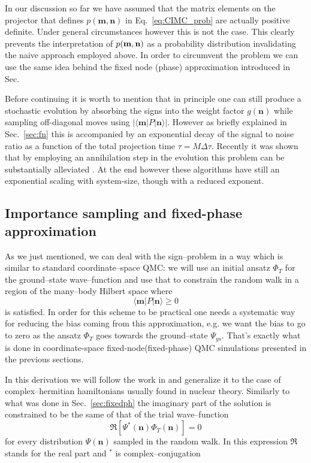 In our discussion so far we have assumed that the matrix elements on the projector that defines $p(\mathbf{m},\mathbf{n})$ in Eq.~\eqref{eq:CIMC_prob} are
actually positive definite. Under general circumstances however this is not the case. This clearly prevents the interpretation 
of $p({\bf m},{\bf n})$ as a probability distribution invalidating the naive approach employed above. In order to circumvent the problem we can use the same idea behind the
fixed node (phase) approximation introduced in Sec.~\label{sec:fn}

Before continuing it is worth to mention that in principle one can still produce a stochastic evolution by absorbing the signs into the weight factor $g(\mathbf{n})$
while sampling off-diagonal moves using $\left \vert \langle \mathbf{m} \lvert P \rvert \mathbf{n} \rangle \right\vert$. However as briefly explained in Sec.~\ref{sec:fn} 
this is accompanied by an exponential decay of the signal to noise ratio as a function of the total projection time $\tau = M \Delta\tau$. Recently it was shown 
that by employing an annihilation step in the evolution this problem can be substantially alleviated \cite{Booth09,Petruzielo12,Booth13}. At the end however these 
algorithms have still an exponential scaling with system-size, though with a reduced exponent.

\subsection{Importance sampling and fixed-phase approximation}
\label{subsect:CCDMC-IS}
As we just mentioned, we can deal with the sign--problem in a way which is similar to standard coordinate--space QMC: we will use an initial ansatz $\Phi_T$ 
for the ground--state wave--function and use that to constrain the random walk in a region of the many--body Hilbert space where 
\begin{equation}
\langle \mathbf{m} \lvert P \rvert \mathbf{n} \rangle \geq 0
\end{equation}
is satisfied. In order for this scheme to be practical one needs a systematic way for reducing the bias coming from this approximation, e.g. we want the bias 
to go to zero as the ansatz $\Phi_T$ goes towards the ground--state $\Psi_{gs}$. That's exactly what is done in coordinate-space fixed-node(fixed-phase) QMC simulations 
presented in the previous sections.

In this derivation we will follow the work in \cite{TenHaaf95,Sorella00} and generalize it to the case of complex--hermitian hamiltonians usually found in nuclear theory.
Similarly to what was done in Sec.~\ref{sec:fixedph} the imaginary part of the solution is constrained to be the same of that of the trial wave--function
\begin{equation}
\Re [\Psi^*(\mathbf{n})\Phi_T(\mathbf{n})] = 0 
\end{equation}
for every distribution $\Psi(\mathbf{n})$ sampled in the random walk. In this expression $\Re$ stands for the real part and $^*$ is complex--conjugation

